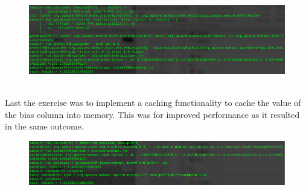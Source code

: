 \documentclass[10pt]{article}
\begin{document}
\pagebreak
\begin{figure}[!h]
\includegraphics[scale=0.37]{fit2.png}
\centering
\end{figure}\\
\indent Last the exercise was to implement a caching functionality to cache the value of the bias column into memory. This was for improved performance as it resulted in the same outcome.
\begin{figure}[!h]
\includegraphics[scale=0.37]{fit3.png}
\centering
\end{figure}\\
\end{document}
